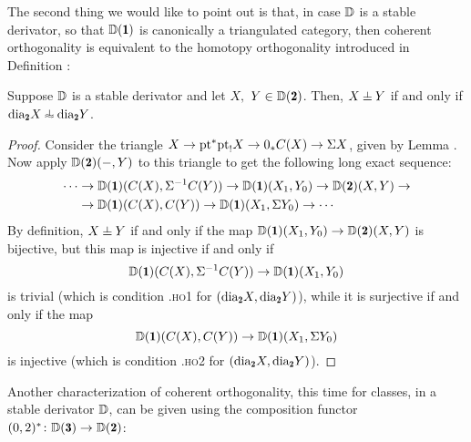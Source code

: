 The second thing we would like to point out is that, in case $\mathbb{D}$ is a stable derivator, so that $\D(\uno)$ is canonically a triangulated category,
then coherent orthogonality is equivalent to the homotopy orthogonality introduced in Definition :
\begin{lemma}\label{coherent_orth_is_wobbly}
Suppose $\mathbb{D}$ is a stable derivator and let $X,$ $Y\in \D(\due)$. Then, $X\corth Y$ if and only if $\dia_{\due}X\horth \dia_{\due}Y$.
\end{lemma}
\begin{proof}
Consider the triangle $X\to \text{pt}^*\text{pt}_!X\to 0_*C(X)\to \Sigma X$,  given by Lemma . Now apply $\D(\due)(-,Y)$ to this triangle to get the following long exact sequence:
\begin{align*}
\label{ort_ses}
\cdots &\to \D(\uno)(C(X),\Sigma^{-1}C(Y))\to \D(\uno)(X_1,Y_0)\to \D(\due)(X,Y)\to \\
\notag &\to\D(\uno)(C(X),C(Y))\to \D(\uno)(X_1,\Sigma Y_0)\to\cdots 
\end{align*}
By definition, $X\corth Y$ if and only if the map $\D(\uno)(X_1,Y_0)\to \D(\due)(X,Y)$ is bijective, but this map is injective if and only if  
\[
\D(\uno)(C(X),\Sigma^{-1}C(Y))\to \D(\uno)(X_1,Y_0)
\] 
is trivial (which is condition .\textsc{ho}1 for $(\dia_{\due}X,\dia_{\due}Y)$), while it is surjective if and only if the map 
\[
\D(\uno)(C(X),C(Y))\to \D(\uno)(X_1,\Sigma Y_0)
\] 
is injective (which is condition .\textsc{ho}2 for $(\dia_{\due}X,\dia_{\due}Y)$).
\end{proof}

Another characterization of coherent orthogonality, this time for classes, in a stable derivator $\mathbb{D}$, can be given using the composition functor $(0,2)^*\colon \D(\tre)\to \D(\due)$:

